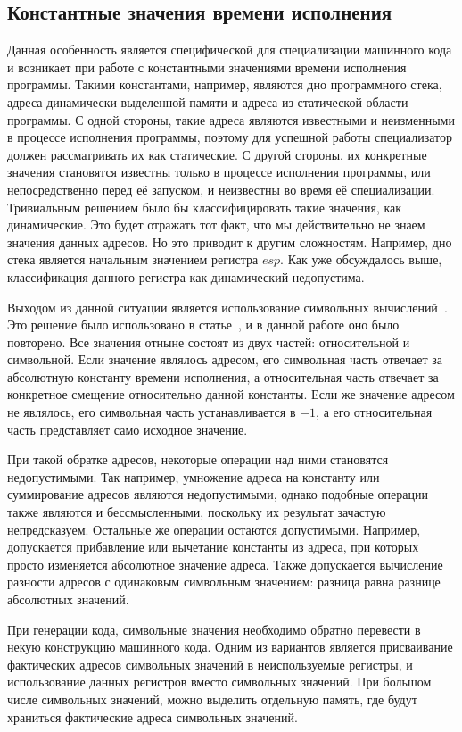 \subsection{Константные значения времени исполнения}
\label{part:4.3}
Данная особенность является специфической для специализации машинного кода и возникает при работе с константными значениями времени исполнения программы. Такими константами, например, являются дно программного стека, адреса динамически выделенной памяти и адреса из статической области программы. С одной стороны, такие адреса являются известными и неизменными в процессе исполнения программы, поэтому для успешной работы специализатор должен рассматривать их как статические.
С другой стороны, их конкретные значения становятся известны только в процессе исполнения программы, или непосредственно перед её запуском,
и неизвестны во время её специализации.
Тривиальным решением было бы классифицировать такие значения, как динамические. Это будет отражать тот факт, что мы действительно не знаем значения данных адресов. Но это приводит к другим сложностям. Например, дно стека является начальным значением регистра $esp$. Как уже обсуждалось выше, классификация данного регистра как динамический недопустима. 

Выходом из данной ситуации является использование символьных вычислений~\cite{TODO}. Это решение было использовано в статье~\cite{PEMC}, и в данной работе оно было повторено. Все значения отныне состоят из двух частей: относительной и символьной.
Если значение являлось адресом, его символьная часть отвечает за абсолютную константу времени исполнения,
а относительная часть отвечает за конкретное смещение относительно данной константы.
Если же значение адресом не являлось, его символьная часть устанавливается в $-1$,
а его относительная часть представляет само исходное значение.

При такой обратке адресов, некоторые операции над ними становятся недопустимыми.
Так например, умножение адреса на константу или суммирование адресов являются недопустимыми,
однако подобные операции также являются и бессмысленными, поскольку их результат зачастую непредсказуем.
Остальные же операции остаются допустимыми.
Например, допускается прибавление или вычетание константы из адреса,
при которых просто изменяется абсолютное значение адреса.
Также допускается вычисление разности адресов с одинаковым символьным значением:
разница равна разнице абсолютных значений.

При генерации кода, символьные значения необходимо обратно перевести в некую конструкцию машинного кода.
Одним из вариантов является присваивание фактических адресов символьных значений в неиспользуемые регистры,
и использование данных регистров вместо символьных значений.
При большом числе символьных значений, можно выделить отдельную память,
где будут храниться фактические адреса символьных значений.


